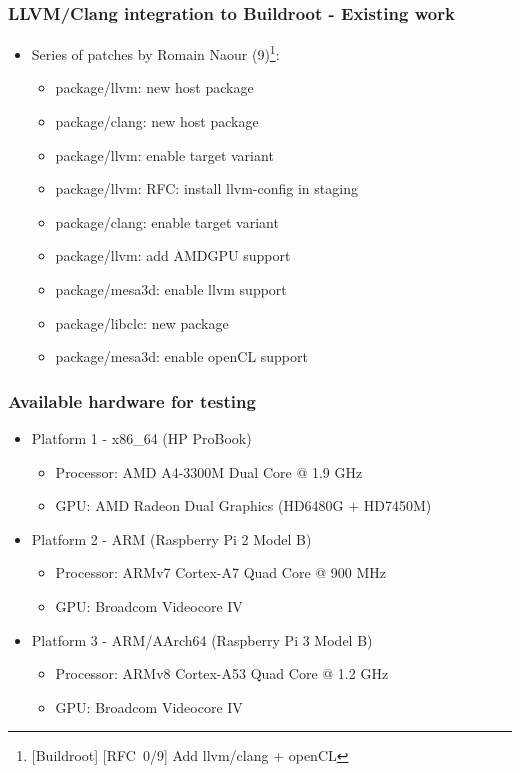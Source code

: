 \documentclass{beamer}
\begin{document}
\begin{frame}
\frametitle{LLVM/Clang integration to Buildroot - Existing work}
\begin{itemize}
  \item Series of patches by Romain Naour (9)\footnote{[Buildroot] [RFC\ 0/9]
  Add llvm/clang + openCL}:
  \begin{itemize}
    \item package/llvm: new host package
    \item package/clang: new host package
    \item package/llvm: enable target variant
    \item package/llvm: RFC: install llvm-config in staging
    \item package/clang: enable target variant
    \item package/llvm: add AMDGPU support
    \item package/mesa3d: enable llvm support
    \item package/libclc: new package
    \item package/mesa3d: enable openCL support
  \end{itemize}
\end{itemize}
\end{frame}

\begin{frame}
\frametitle{Available hardware for testing}
\begin{itemize}
  \item Platform 1 - x86\_64 (HP ProBook)
  \begin{itemize}
    \item Processor: AMD A4-3300M Dual Core @ 1.9 GHz
    \item GPU: AMD Radeon Dual Graphics (HD6480G + HD7450M)
  \end{itemize}
  \item Platform 2 - ARM (Raspberry Pi 2 Model B)
  \begin{itemize}
    \item Processor: ARMv7 Cortex-A7 Quad Core @ 900 MHz
    \item GPU: Broadcom Videocore IV
  \end{itemize}
  \item Platform 3 - ARM/AArch64 (Raspberry Pi 3 Model B)
  \begin{itemize}
    \item Processor: ARMv8 Cortex-A53 Quad Core @ 1.2 GHz
    \item GPU: Broadcom Videocore IV
  \end{itemize}
\end{itemize}
\end{frame}
\end{document}
